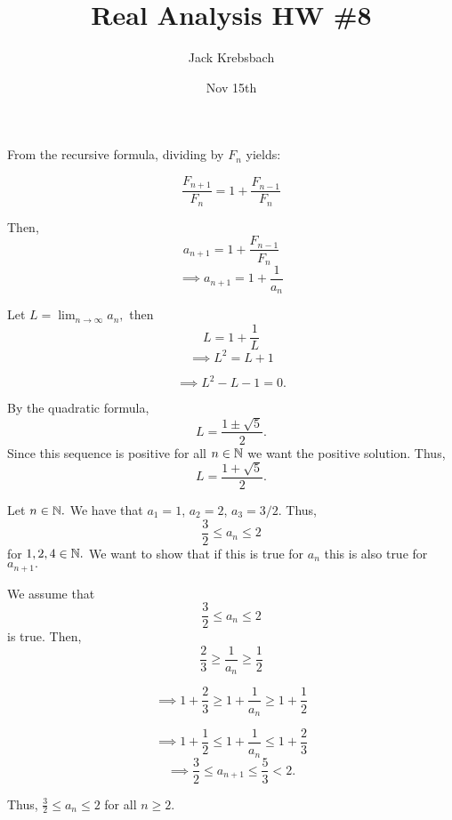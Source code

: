 \documentclass{report}
\title{Real Analysis HW \#8}
\author{Jack Krebsbach }
\date{Nov 15th}
\begin{document}
\maketitle



\sol
From the recursive formula, dividing by $F_n$ yields:

$$\frac{F_{n+1}}{F_n} = 1 + \frac{F_{n-1}}{F_n} $$

Then, $$a_{n+1} = 1 + \frac{F_{n-1}}{F_n}$$
$$ \implies a_{n+1} = 1 + \frac{1}{a_n}$$

Let $L = \lim_{n \rightarrow \infty} a_n,$ then  $$ L = 1 + \frac{1}{L}$$
$$ \implies L^2 = L + 1$$


$$\implies L^2 - L -1=0.$$

By the quadratic formula,  $$L = \frac{ 1 \pm \sqrt{5}}{2}.$$ Since this sequence is positive for all $n \in \NN$  we want the positive solution. Thus, $$L  = \frac{ 1 + \sqrt{5}}{2}.$$



\pagebreak


\begin{myproof}
    
  Let $n\in \NN.$ We have that $a_1 = 1$, $a_2 = 2$, $a_3 = 3/2.$ Thus, $$\frac{3}{2} \leq a_n \leq 2$$ for $1,2,4 \in \NN.$ We want to show that if this is true for $a_n$ this is also true for $a_{n+1}.$

We assume that $$ \frac{3}{2} \leq a_n \leq 2$$ is true.  Then,
$$ \frac{2}{3} \geq \frac{1}{a_n} \geq \frac{1}{2}$$

$$\implies  1+ \frac{2}{3} \geq 1+ \frac{1}{a_n} \geq 1+\frac{1}{2}$$

$$\implies  1+ \frac{1}{2} \leq 1+ \frac{1}{a_n} \leq 1+\frac{2}{3}$$
$$\implies  \frac{3}{2} \leq a_{n+1} \leq \frac{5}{3} < 2.$$

Thus, $\frac{3}{2} \leq a_n \leq 2$ for all  $n \geq 2.$
\end{myproof}
\end{document}
